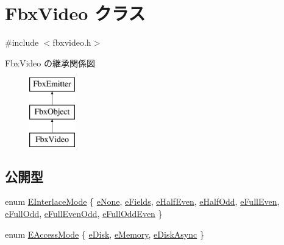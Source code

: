 \hypertarget{class_fbx_video}{}\section{Fbx\+Video クラス}
\label{class_fbx_video}


{\ttfamily \#include $<$fbxvideo.\+h$>$}

Fbx\+Video の継承関係図\begin{figure}[H]
\begin{center}
\leavevmode
\includegraphics[height=3.000000cm]{class_fbx_video}
\end{center}
\end{figure}
\subsection*{公開型}
\begin{DoxyCompactItemize}
\item 
enum \hyperlink{class_fbx_video_a1e60229c28a15e29289f3f00b23aa215}{E\+Interlace\+Mode} \{ \newline
\hyperlink{class_fbx_video_a1e60229c28a15e29289f3f00b23aa215a704fe60074b80df20b68fedcda6b9b4f}{e\+None}, 
\hyperlink{class_fbx_video_a1e60229c28a15e29289f3f00b23aa215a70210f309a14cf3fe1fdfdec93536f80}{e\+Fields}, 
\hyperlink{class_fbx_video_a1e60229c28a15e29289f3f00b23aa215ad04c4acb98e0446dfc296e2287c56a6f}{e\+Half\+Even}, 
\hyperlink{class_fbx_video_a1e60229c28a15e29289f3f00b23aa215aa3c9bb81d958669eb0d66f481b5b4b57}{e\+Half\+Odd}, 
\newline
\hyperlink{class_fbx_video_a1e60229c28a15e29289f3f00b23aa215aa4207eff0569b05011c820555f206e6e}{e\+Full\+Even}, 
\hyperlink{class_fbx_video_a1e60229c28a15e29289f3f00b23aa215af4f5d62b92c2487787b429965829a70c}{e\+Full\+Odd}, 
\hyperlink{class_fbx_video_a1e60229c28a15e29289f3f00b23aa215a5643f7d85ee0d023d43b0d0feb11ea73}{e\+Full\+Even\+Odd}, 
\hyperlink{class_fbx_video_a1e60229c28a15e29289f3f00b23aa215aa342e3401c45173cdfd733920163340f}{e\+Full\+Odd\+Even}
 \}
\item 
enum \hyperlink{class_fbx_video_a6dd88dabb2170adcd8c58952ed2e0c40}{E\+Access\+Mode} \{ \hyperlink{class_fbx_video_a6dd88dabb2170adcd8c58952ed2e0c40acca51c771e1f539812097982a4e62d80}{e\+Disk}, 
\hyperlink{class_fbx_video_a6dd88dabb2170adcd8c58952ed2e0c40aea3d1fa828ba9d118a2f8da3fd944f41}{e\+Memory}, 
\hyperlink{class_fbx_video_a6dd88dabb2170adcd8c58952ed2e0c40ab7a1eb0357475f15c29683abcc1f16e3}{e\+Disk\+Async}
 \}
\end{DoxyCompactItemize}
